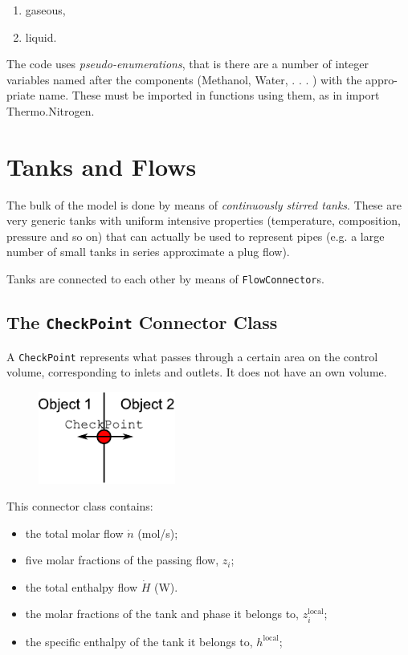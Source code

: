 \documentclass[a4paper]{article}
\begin{document}
\begin{enumerate}
\item gaseous,
\item liquid.
\end{enumerate}

The code uses \emph{pseudo-enumerations}, that is there are a number of integer
variables named after the components (Methanol, Water, . . . ) with the appro-
priate name. These must be imported in functions using them, as in import
Thermo.Nitrogen.


\section{Tanks and Flows}
The bulk of the model is done by means of \emph{continuously stirred tanks}.
These are very generic tanks with uniform intensive properties (temperature,
composition, pressure and so on) that can actually be used to represent pipes
(e.g. a large number of small tanks in series approximate a plug flow).

Tanks are connected to each other by means of \texttt{FlowConnector}s.


\subsection{The \texttt{CheckPoint} Connector Class}
A \texttt{CheckPoint} represents what passes through a certain area on the
control volume, corresponding to inlets and outlets. It does not have an own
volume.

\begin{figure}[h]
\centering
\includegraphics[width=0.4\textwidth]{pics/checkpoint}
\end{figure}

This connector class contains:

\begin{itemize}
\item the total molar flow $\dot n$ (mol/s);
\item five molar fractions of the passing flow, $z_i$;
\item the total enthalpy flow $\dot H$ (W).
\item the molar fractions of the tank and phase it belongs to,
$z^\text{local}_i$;
\item the specific enthalpy of the tank it belongs to, $h^\text{local}$;
\end{itemize}
\end{document}
